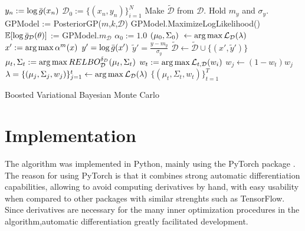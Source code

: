 \begin{Algorithm}
\begin{algorithmic}[1]
	\State $y_n := \log {\bar{g}}(x_n)$
	\EndFor
	\State $\mathcal{D}_0 := \{(x_n,y_n)\}_{i=1}^N$
	\State Make $\tilde{\mathcal{D}}$ from $\mathcal{D}$. Hold $m_y$ and $\sigma_y$. 
	\State GPModel := PosteriorGP($m$,$k$,$\mathcal{D}$)
	\State GPModel.MaximizeLogLikelihood() 
	\State ${\mathbb E}[\log {\bar{g}}_\mathcal{D}(\theta)]$ := GPModel.$m_\mathcal{D}$
	\State $\alpha_0 := 1.0$
	\State $(\mu_0,\Sigma_0)\ \gets \operatorname*{arg\,max} \mathcal{L}_\mathcal{D}(\lambda)$ 
		\State $x' := \operatorname*{arg\,max} \alpha^m(x)$ 
		\State $y' = \log {\bar{g}}(x')$
		\State $\tilde{y}' = \frac{y - m_y}{\sigma_y}$
		\State $\tilde{\mathcal{D}} \gets \tilde{\mathcal{D}} \cup \{(x',\tilde{y}')\}$
		\State $\mu_{t},\Sigma_{t} := \operatorname*{arg\,max} RELBO^{\delta_D}_\mathcal{D}(\mu_{t},\Sigma_{t})$
		\State $w_{t} := \operatorname*{arg\,max} \mathcal{L}_{t,\mathcal{D}}(w_i)$ 
			\State $w_{j} \gets (1-w_t)w_j$
		\EndFor
			\State $\lambda = \{(\mu_j,\Sigma_j,w_j)\}_{j=1}^t \gets \operatorname*{arg\,max} \mathcal{L}_\mathcal{D}(\lambda)$ 
		\EndIf
	\EndFor
	\State \Return $\{(\mu_t,\Sigma_t,w_t)\}_{t=1}^T$
	\EndProcedure
	\caption{\label{bvbmcalgorithm}Boosted Variational Bayesian Monte Carlo}
\end{algorithmic}
\end{Algorithm}

\section{Implementation}
The algorithm was implemented in Python, mainly using the PyTorch package \cite{Paszke_2017}. The reason for using PyTorch is that it combines strong automatic differentiation capabilities, allowing to avoid computing derivatives by hand, with easy usability when compared to other packages with similar strenghts such as TensorFlow. Since derivatives are necessary for the many inner optimization procedures in the algorithm,automatic differentiation greatly facilitated development. 


